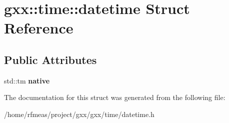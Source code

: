 \hypertarget{structgxx_1_1time_1_1datetime}{}\section{gxx\+:\+:time\+:\+:datetime Struct Reference}
\label{structgxx_1_1time_1_1datetime}
\subsection*{Public Attributes}
\begin{DoxyCompactItemize}
\item 
std\+::tm {\bfseries native}\hypertarget{structgxx_1_1time_1_1datetime_a29a778f2d392426b7478dcfe00ca5b07}{}\label{structgxx_1_1time_1_1datetime_a29a778f2d392426b7478dcfe00ca5b07}

\end{DoxyCompactItemize}


The documentation for this struct was generated from the following file\+:\begin{DoxyCompactItemize}
\item 
/home/rfmeas/project/gxx/gxx/time/datetime.\+h\end{DoxyCompactItemize}
